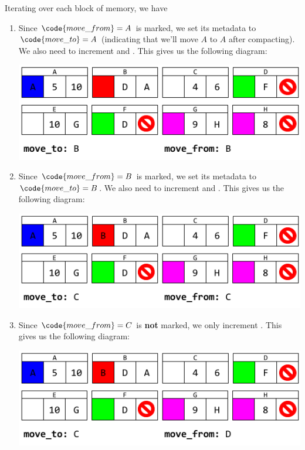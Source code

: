 \documentclass[letterpaper]{article}
\begin{document}
Iterating over each block of memory, we have 
\begin{enumerate}
    \item Since $\code{move\_from} = A$ is marked, we set its metadata to $\code{move\_to} = A$ (indicating that we'll move $A$ to $A$ after compacting). We also need to increment  and . This gives us the following diagram: 
    \begin{center}
        \includegraphics[scale=0.6]{../assets/GCAlg3_1.png}
    \end{center}

    \item Since $\code{move\_from} = B$ is marked, we set its metadata to $\code{move\_to} = B$. We also need to increment  and . This gives us the following diagram: 
    \begin{center}
        \includegraphics[scale=0.6]{../assets/GCAlg3_2.png}
    \end{center}

    \item Since $\code{move\_from} = C$ is \textbf{not} marked, we only increment . This gives us the following diagram: 
    \begin{center}
        \includegraphics[scale=0.6]{../assets/GCAlg3_3.png}
    \end{center}


\end{enumerate}
\end{document}
